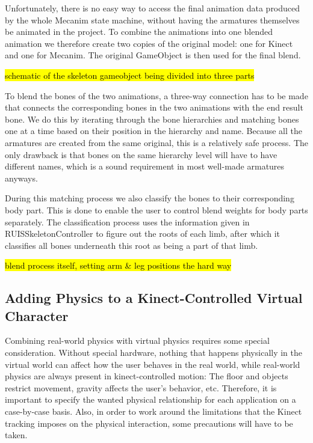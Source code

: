 \documentclass[12pt,a4paper,oneside,pdftex]{report}
\begin{document}
Unfortunately, there is no easy way to access the final animation data produced by the whole Mecanim state machine, without having the armatures themselves be animated in the project. To combine the animations into one blended animation we therefore create two copies of the original model: one for Kinect and one for Mecanim. The original GameObject is then used for the final blend. 

\hl{schematic of the skeleton gameobject being divided into three parts}

To blend the bones of the two animations, a three-way connection has to be made that connects the corresponding bones in the two animations with the end result bone. We do this by iterating through the bone hierarchies and matching bones one at a time based on their position in the hierarchy and name. Because all the armatures are created from the same original, this is a relatively safe process. The only drawback is that bones on the same hierarchy level will have to have different names, which is a sound requirement in most well-made armatures anyways. 

During this matching process we also classify the bones to their corresponding body part. This is done to enable the user to control blend weights for body parts separately. The classification process uses the information given in RUISSkeletonController to figure out the roots of each limb, after which it classifies all bones underneath this root as being a part of that limb. 

\hl{blend process itself, setting arm & leg positions the hard way}

\subsection{Adding Physics to a Kinect-Controlled Virtual Character}
\label{subsection:skeletontracking:physics}

Combining real-world physics with virtual physics requires some special consideration. Without special hardware, nothing that happens physically in the virtual world can affect how the user behaves in the real world, while real-world physics are always present in kinect-controlled motion: The floor and objects restrict movement, gravity affects the user's behavior, etc. Therefore, it is important to specify the wanted physical relationship for each application on a case-by-case basis. Also, in order to work around the limitations that the Kinect tracking imposes on the physical interaction, some precautions will have to be taken.
\end{document}
